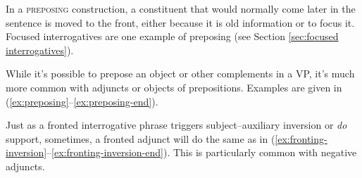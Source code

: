 In a \textsc{preposing} construction, a constituent that would normally come later in the sentence is moved to the front, either because it is old information or to focus it. Focused interrogatives are one example of preposing (see Section \ref{sec:focused interrogatives}). 

While it's possible to prepose an object or other complements in a VP, it's much more common with adjuncts or objects of prepositions. Examples are given in (\ref{ex:preposing}--\ref{ex:preposing-end}).

\ea \label{ex:preposing}
    \z
\ex 
    \z
\begin{samepage}
\ex
    \z
\end{samepage}
\ex 
    \z
\ex 
    \z
\ex \label{ex:preposing-end}
    \z
\z

Just as a fronted interrogative phrase triggers subject--auxiliary inversion or \textit{do} support, sometimes, a fronted adjunct will do the same as in (\ref{ex:fronting-inversion}--\ref{ex:fronting-inversion-end}). This is particularly common with negative adjuncts. 

